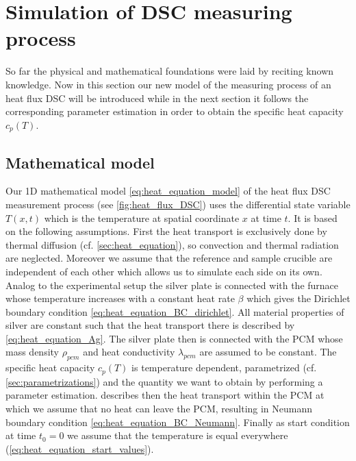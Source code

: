 \documentclass{scrartcl}[12pt, halfparskip]
\numberwithin{equation}{section}
\numberwithin{figure}{section}
\numberwithin{table}{section}
\begin{document}
\newpage
\section{Simulation of DSC measuring process}
\label{sec:simulation_of_DSC}

So far the physical and mathematical foundations were laid by reciting known knowledge. Now in this section our new model of the measuring process of an heat flux DSC will be introduced while in the next section it follows the corresponding parameter estimation in order to obtain the specific heat capacity $c_p(T)$.



\subsection{Mathematical model}
\label{sec:mathematical_model}

Our 1D mathematical model \cref{eq:heat_equation_model} of the heat flux DSC measurement process (see \cref{fig:heat_flux_DSC}) uses the differential state variable $T(x,t)$ which is the temperature at spatial coordinate $x$ at time $t$. It is based on the following assumptions. First the heat transport is exclusively done by thermal diffusion (cf. \cref{sec:heat_equation}), so convection and thermal radiation are neglected. 
Moreover we assume that the reference and sample crucible  are independent of each other which allows us to simulate each side on its own. 
Analog to the experimental setup the silver plate is connected with the furnace whose temperature increases with a constant heat rate $\beta$ which gives the Dirichlet boundary condition \cref{eq:heat_equation_BC_dirichlet}. All material properties of silver are constant such that the heat transport there is described by \cref{eq:heat_equation_Ag}. The silver plate then is connected with the PCM whose mass density $\rho_{pcm}$ and heat conductivity $\lambda_{pcm}$ are assumed to be constant. The specific heat capacity $c_p(T)$ is temperature dependent, parametrized (cf. \cref{sec:parametrizations}) and the quantity we want to obtain by performing a parameter estimation.  describes then the heat transport within the PCM at which we assume that no heat can leave the PCM, resulting in Neumann boundary condition \cref{eq:heat_equation_BC_Neumann}. Finally as start condition at time ${t_0 = 0}$ we assume that the temperature is equal everywhere (\cref{eq:heat_equation_start_values}).
\end{document}
